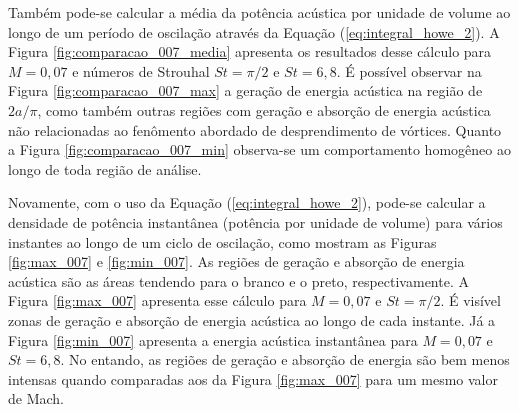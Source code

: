 \newpage
Também pode-se calcular a média da potência acústica por unidade de volume ao longo de um período de oscilação através da Equação (\ref{eq:integral_howe_2}). A Figura \ref{fig:comparacao_007_media} apresenta os resultados desse cálculo para $M = 0,07$ e números de Strouhal $St = \pi/2$ e $St = 6,8$. É possível observar na Figura \ref{fig:comparacao_007_max} a geração de energia acústica na região de $2a/\pi$, como também outras regiões com geração e absorção de energia acústica não relacionadas ao fenômento abordado de desprendimento de vórtices. Quanto a Figura \ref{fig:comparacao_007_min} observa-se um comportamento homogêneo ao longo de toda região de análise.    

Novamente, com o uso da Equação (\ref{eq:integral_howe_2}), pode-se calcular a densidade de potência instantânea (potência por unidade de volume) para vários instantes ao longo de um ciclo de oscilação, como mostram as Figuras \ref{fig:max_007} e \ref{fig:min_007}. As regiões de geração e absorção de energia acústica são as áreas tendendo para o branco e o preto, respectivamente. A Figura \ref{fig:max_007} apresenta  esse cálculo para $M = 0,07$ e $St = \pi/2$. É visível zonas de geração e absorção de energia acústica ao longo de cada instante. Já a Figura \ref{fig:min_007} apresenta a energia acústica instantânea para $M = 0,07$ e $St = 6,8$. No entando, as regiões de geração e absorção de energia são bem menos intensas quando comparadas aos da Figura \ref{fig:max_007} para um mesmo valor de Mach.

